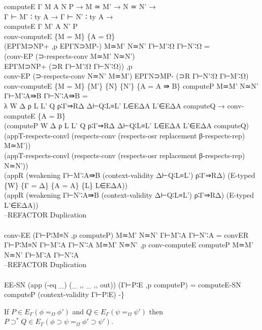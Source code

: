 {\begin{code}
{\>             computeE Γ M A N P → M ≃ M' → N ≃ N' → \<\\
\>             Γ ⊢ M' ∶ ty A  → Γ ⊢ N' ∶ ty A  →\<\\
\>             computeE Γ M' A N' P\<\\
\>conv-computeE \{M = M\} \{A = Ω\} \<\\
\>  (EPΓM⊃NP+ ,p EPΓN⊃MP-) M≃M' N≃N' Γ⊢M'∶Ω Γ⊢N'∶Ω = \<\\
\>  (conv-EP (⊃-respects-conv M≃M' N≃N')\<\\
\>    EPΓM⊃NP+ (⊃R Γ⊢M'∶Ω Γ⊢N'∶Ω)) ,p \<\\
\>  conv-EP (⊃-respects-conv N≃N' M≃M') EPΓN⊃MP- (⊃R Γ⊢N'∶Ω Γ⊢M'∶Ω)\<\\
\>conv-computeE \{M = M\} \{M'\} \{N\} \{N'\} \{A = A ⇛ B\} computeP M≃M' N≃N' Γ⊢M'∶A⇛B Γ⊢N'∶A⇛B =\<\\
\>  λ W Δ ρ L L' Q ρ∶Γ⇒RΔ Δ⊢Q∶L≡L' L∈EΔA L'∈EΔA computeQ → conv-computeE \{A = B\} \<\\
\>  (computeP W Δ ρ L L' Q ρ∶Γ⇒RΔ Δ⊢Q∶L≡L' L∈EΔA L'∈EΔA computeQ) \<\\
\>  (appT-respects-convl (respects-conv (respects-osr replacement β-respects-rep) M≃M')) \<\\
\>  (appT-respects-convl (respects-conv (respects-osr replacement β-respects-rep) N≃N')) \<\\
\>  (appR (weakening Γ⊢M'∶A⇛B (context-validity Δ⊢Q∶L≡L') ρ∶Γ⇒RΔ) (E-typed \{W\} \{Γ = Δ\} \{A = A\} \{L\} L∈EΔA)) \<\\
\>  (appR (weakening Γ⊢N'∶A⇛B (context-validity Δ⊢Q∶L≡L') ρ∶Γ⇒RΔ) (E-typed L'∈EΔA)) \<\\
\>--REFACTOR Duplication\<\\
\>\<\\
\>conv-EE (Γ⊢P∶M≡N ,p computeP) M≃M' N≃N' Γ⊢M'∶A Γ⊢N'∶A = convER Γ⊢P∶M≡N Γ⊢M'∶A Γ⊢N'∶A M≃M' N≃N' ,p conv-computeE computeP M≃M' N≃N' Γ⊢M'∶A Γ⊢N'∶A\<\\
\>--REFACTOR Duplication                      \<\\
\>                 \<\\
\>EE-SN (app (-eq \_) (\_ ,, \_ ,, out)) (Γ⊢P∶E ,p computeP) = computeE-SN computeP (context-validity Γ⊢P∶E) -\}}\<%
\end{code}
}

\begin{lm}
\label{lm:Esupset}
If $P \in E_\Gamma(\phi =_\Omega \phi')$ and $Q \in E_\Gamma(\psi =_\Omega \psi')$ then
$P \supset^* Q \in E_\Gamma(\phi \supset \psi =_\Omega \phi' \supset \psi')$.
\end{lm}

